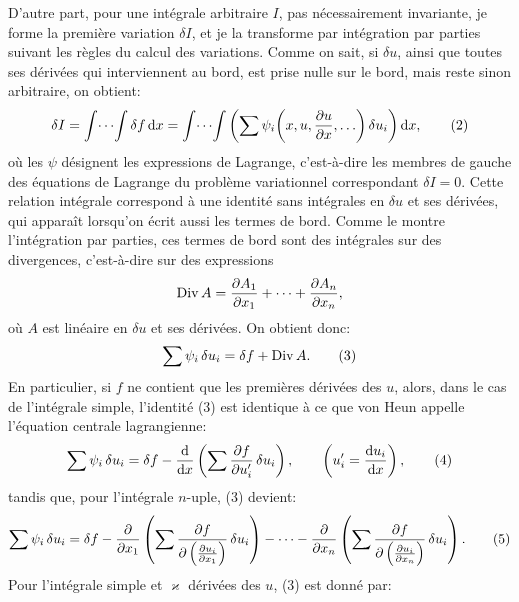 D'autre part, pour une intégrale arbitraire \(I\), pas nécessairement invariante, je forme la première variation \(\delta I\), et je la transforme par intégration par parties suivant les règles du calcul des variations. Comme on sait, si \(\delta u\), ainsi que toutes ses dérivées qui interviennent au bord, est prise nulle sur le bord, mais reste sinon arbitraire, on obtient:
\begin{equation}
\delta I=\int\!\cdots\!\int \delta f\,\mathrm d x
=\int\!\cdots\!\int\left(\sum\psi_i\!\left(x,u,\frac{\partial u}{\partial x},\ldots\right)\delta u_i\right)\mathrm d x,
\tag{2}
\end{equation}
où les \(\psi\) désignent les expressions de Lagrange, c'est-à-dire les membres de gauche des équations de Lagrange du problème variationnel correspondant \(\delta I=0\). Cette relation intégrale correspond à une identité sans intégrales en \(\delta u\) et ses dérivées, qui apparaît lorsqu'on écrit aussi les termes de bord. Comme le montre l'intégration par parties, ces termes de bord sont des intégrales sur des divergences, c'est-à-dire sur des expressions
\[
\operatorname{Div} A=\frac{\partial A_1}{\partial x_1}+\cdots+\frac{\partial A_n}{\partial x_n},
\]
où \(A\) est linéaire en \(\delta u\) et ses dérivées. On obtient donc:
\begin{equation}
\sum\psi_i\,\delta u_i=\delta f+\operatorname{Div} A.
\tag{3}
\end{equation}
En particulier, si \(f\) ne contient que les premières dérivées des \(u\), alors, dans le cas de l'intégrale simple, l'identité (3) est identique à ce que von Heun appelle l'\og{}équation centrale lagrangienne\fg{}:
\begin{equation}
\sum \psi_i\,\delta u_i
=\delta f-\frac{\mathrm d}{\mathrm d x}\left(\sum\frac{\partial f}{\partial u_i'}\,\delta u_i\right),
\qquad \left(u_i'=\frac{\mathrm d u_i}{\mathrm d x}\right),
\tag{4}
\end{equation}
tandis que, pour l'intégrale \(n\)-uple, (3) devient:
\begin{equation}
\sum\psi_i\,\delta u_i
=
\delta f
-\frac{\partial}{\partial x_1}\left(\sum\frac{\partial f}{\partial \left(\frac{\partial u_i}{\partial x_1}\right)}\,\delta u_i\right)
-\cdots
-\frac{\partial}{\partial x_n}\left(\sum\frac{\partial f}{\partial \left(\frac{\partial u_i}{\partial x_n}\right)}\,\delta u_i\right).
\tag{5}
\end{equation}
Pour l'intégrale simple et \(\varkappa\) dérivées des \(u\), (3) est donné par:
